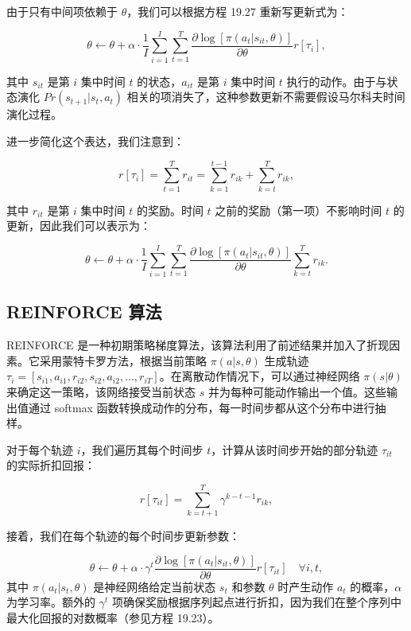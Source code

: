 由于只有中间项依赖于 \(\theta\)，我们可以根据方程 19.27 重新写更新式为：

\[
\theta \leftarrow \theta + \alpha \cdot \frac{1}{I} \sum_{i=1}^{I} \sum_{t=1}^{T} \frac{\partial \log [\pi(a_t|s_{it}, \theta)]}{\partial \theta} r[\tau_i], \tag{19.29}
\]

其中 \(s_{it}\) 是第 \(i\) 集中时间 \(t\) 的状态，\(a_{it}\) 是第 \(i\) 集中时间 \(t\) 执行的动作。由于与状态演化 \(Pr(s_{t+1}|s_t, a_t)\) 相关的项消失了，这种参数更新不需要假设马尔科夫时间演化过程。

进一步简化这个表达，我们注意到：

\[
r[\tau_i] = \sum_{t=1}^{T} r_{it} = \sum_{k=1}^{t-1} r_{ik} + \sum_{k=t}^{T} r_{ik}, \tag{19.30}
\]

其中 \(r_{it}\) 是第 \(i\) 集中时间 \(t\) 的奖励。时间 \(t\) 之前的奖励（第一项）不影响时间 \(t\) 的更新，因此我们可以表示为：

\[
\theta \leftarrow \theta + \alpha \cdot \frac{1}{I} \sum_{i=1}^{I} \sum_{t=1}^{T} \frac{\partial \log [\pi(a_t|s_{it}, \theta)]}{\partial \theta} \sum_{k=t}^{T} r_{ik}. \tag{19.31}
\]

\subsection{REINFORCE 算法}
REINFORCE 是一种初期策略梯度算法，该算法利用了前述结果并加入了折现因素。它采用蒙特卡罗方法，根据当前策略 \(\pi(a|s, \theta)\) 生成轨迹 \(\tau_i = [s_{i1}, a_{i1}, r_{i2}, s_{i2}, a_{i2}, \ldots, r_{iT}]\)。在离散动作情况下，可以通过神经网络 \(\pi(s|\theta)\) 来确定这一策略，该网络接受当前状态 \(s\) 并为每种可能动作输出一个值。这些输出值通过 softmax 函数转换成动作的分布，每一时间步都从这个分布中进行抽样。

对于每个轨迹 \(i\)，我们遍历其每个时间步 \(t\)，计算从该时间步开始的部分轨迹 \(\tau_{it}\) 的实际折扣回报：

\[
r[\tau_{it}] = \sum_{k=t+1}^{T} \gamma^{k-t-1} r_{ik}, \tag{19.32}
\]

接着，我们在每个轨迹的每个时间步更新参数：

\[
\theta \leftarrow \theta + \alpha \cdot \gamma^{t} \frac{\partial \log [\pi(a_t|s_{it}, \theta)]}{\partial \theta} r[\tau_{it}] \quad \forall i, t, \tag{19.33}
\]
其中 \(\pi(a_t|s_t, \theta)\) 是神经网络给定当前状态 \(s_t\) 和参数 \(\theta\) 时产生动作 \(a_t\) 的概率，\(\alpha\) 为学习率。额外的 \(\gamma^{t}\) 项确保奖励根据序列起点进行折扣，因为我们在整个序列中最大化回报的对数概率（参见方程 19.23）。

